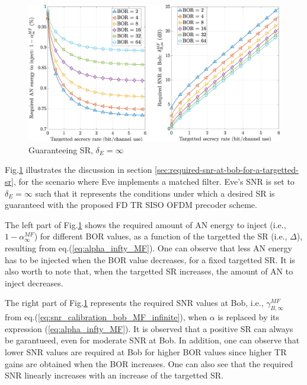 \documentclass[journal,comsoc]{IEEEtran}
\let\MYoriglatexcaption\caption
\renewcommand{\caption}[2][\relax]{\MYoriglatexcaption[#2]{#2}}
\begin{document}
\begin{figure}[h!t]
	\centering
	\captionsetup{justification=centering}
	\includegraphics[width=1\linewidth]{graphs/SR_guarantee.eps}
	\caption{Guaranteeing SR, $\delta_E = \infty$}
	\label{fig_targettedSR}
\end{figure} 
Fig.\ref{fig_targettedSR} illustrates the discussion in section \ref{sec:required-snr-at-bob-for-a-targetted-sr}, for the scenario where Eve implements a matched filter. Eve's SNR is set to $\delta_E = \infty$ such that it represents the conditions under which a desired SR is guaranteed with the proposed FD TR SISO OFDM precoder scheme.

The left part of Fig.\ref{fig_targettedSR} shows the required amount of AN energy to inject (i.e., $1-\alpha_{\infty}^{MF}$) for different BOR values, as a function of the targetted the SR (i.e., $\Delta$), resulting from eq.(\ref{eq:alpha_infty_MF}). One can observe that less AN energy has to be injected when the BOR value decreases, for a fixed targetted SR. It is also worth to note that, when the targetted SR increases, the amount of AN to inject decreases. 

The right part of Fig.\ref{fig_targettedSR} represents the required SNR values at Bob, i.e., $\gamma_{B,\infty}^{MF}$ from eq.(\ref{eq:snr_calibration_bob_MF_infinite}), when $\alpha$ is replaced by its expression (\ref{eq:alpha_infty_MF}). It is observed that a positive SR can always be garantueed, even for moderate SNR at Bob. In addition, one can observe that lower SNR values are required at Bob for higher BOR values since higher TR gains are obtained when the BOR increases. One can also see that the required SNR linearly increases with an increase of the targetted SR. 
\end{document}
